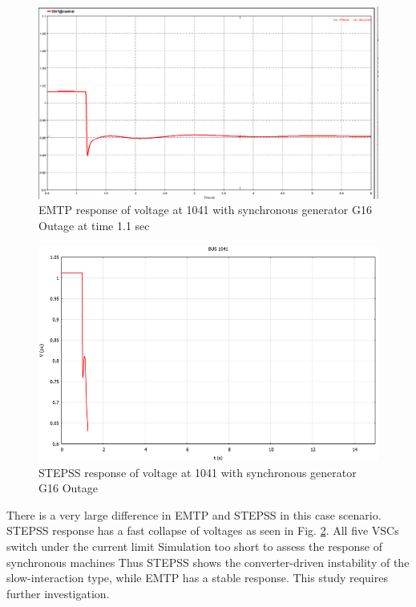\documentclass{report}
\begin{document}
\begin{figure}
    \centering
    \includegraphics[width=1\linewidth]{Figure_Nordic/V1041.png}
    \caption{EMTP response of voltage at 1041 with synchronous generator G16 Outage at time 1.1 sec}
    \label{fig:V1041_VSCs}
\end{figure}
\begin{figure}
    \centering
    \includegraphics[width=1\linewidth]{Figure_Nordic//Results/V1041STEPSS.png}
    \caption{STEPSS response of voltage at 1041 with synchronous generator G16 Outage}
    \label{fig:STEPSSV1041}
\end{figure}
There is a very large difference in EMTP and STEPSS in this case scenario. STEPSS response has a fast collapse of voltages as seen in Fig. \ref{fig:STEPSSV1041}. All five VSCs switch under the current limit
Simulation too short to assess the response of synchronous machines
Thus STEPSS shows the converter-driven instability of the slow-interaction type, while EMTP has a stable response. This study requires further investigation. 
\end{document}
